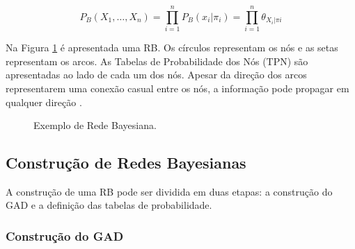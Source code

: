 \begin{equation}\label{fundamentacao:redes:eq}
  P_{B}(X_{1}, \ldots, X_{n}) = \prod\limits_{i=1}^n P_{B}(x_{i}|\pi_{i}) = \prod\limits_{i=1}^n \theta_{X_{i}|\pi{i}}
\end{equation}

Na Figura \ref{fundamentacao:redes:exemplo} é apresentada uma RB. Os círculos representam os nós e as setas representam os arcos. As Tabelas de Probabilidade dos Nós (TPN) são apresentadas ao lado de cada um dos nós. Apesar da direção dos arcos representarem uma conexão casual entre os nós, a informação pode propagar em qualquer direção \cite{pearl}.

\begin{figure}[H]
\begin{center}
    \end{center}
    \caption{Exemplo de Rede Bayesiana.}
    \label{fundamentacao:redes:exemplo}
\end{figure}

\subsection{Construção de Redes Bayesianas}
\label{fundamentacao:redes:construcao}

A construção de uma RB pode ser dividida em duas etapas: a construção do GAD e a definição das tabelas de probabilidade.

\subsubsection{Construção do GAD}
\label{fundamentacao:redes:construcao:gad}

